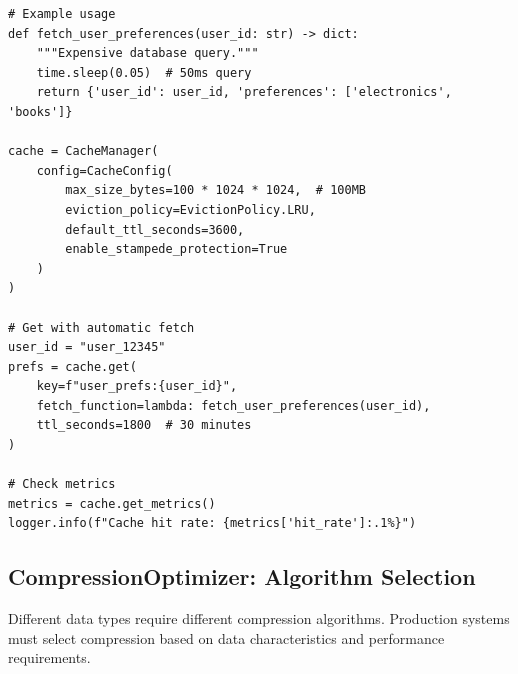 \begin{lstlisting}[style=python, caption={Cache Manager with Intelligent Eviction}]
# Example usage
def fetch_user_preferences(user_id: str) -> dict:
    """Expensive database query."""
    time.sleep(0.05)  # 50ms query
    return {'user_id': user_id, 'preferences': ['electronics', 'books']}

cache = CacheManager(
    config=CacheConfig(
        max_size_bytes=100 * 1024 * 1024,  # 100MB
        eviction_policy=EvictionPolicy.LRU,
        default_ttl_seconds=3600,
        enable_stampede_protection=True
    )
)

# Get with automatic fetch
user_id = "user_12345"
prefs = cache.get(
    key=f"user_prefs:{user_id}",
    fetch_function=lambda: fetch_user_preferences(user_id),
    ttl_seconds=1800  # 30 minutes
)

# Check metrics
metrics = cache.get_metrics()
logger.info(f"Cache hit rate: {metrics['hit_rate']:.1%}")
\end{lstlisting}

\subsection{CompressionOptimizer: Algorithm Selection}

Different data types require different compression algorithms. Production systems must select compression based on data characteristics and performance requirements.

